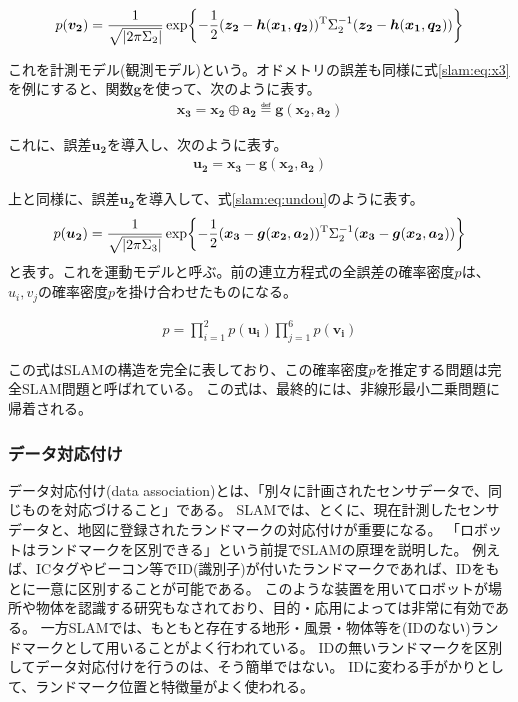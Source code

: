 \begin{align}
  p(\bm{v_2}) =\frac{1}{\sqrt{|2\pi\Sigma_2|}}\exp\biggl\{-\frac{1}{2}(\bm{z_2}-\bm{h}(\bm{x_1},\bm{q_2}))^{\rm{T}}\Sigma_2^{-1}(\bm{z_2}-\bm{h}(\bm{x_1},\bm{q_2}))\biggr\}\label{slam:eq:keisoku}
\end{align}

これを計測モデル(観測モデル)という。オドメトリの誤差も同様に式\eqref{slam:eq:x3}を例にすると、関数$\bm{g}$を使って、次のように表す。
\begin{align*}
  \bm{x_3} = \bm{x_2}\oplus \bm{a_2} \eqdef \bm{g}(\bm{x_2},\bm{a_2})
\end{align*}

これに、誤差$\bm{u_2}$を導入し、次のように表す。
\begin{align*}
  \bm{u_2} = \bm{x_3}-\bm{g}(\bm{x_2,a_2})
\end{align*}

上と同様に、誤差$\bm{u_2}$を導入して、式\eqref{slam:eq:undou}のように表す。
\begin{align}
  p(\bm{u_2}) = \frac{1}{\sqrt{|2\pi\Sigma_3|}}\exp\biggl\{-\frac{1}{2}(\bm{x_3}-\bm{g}(\bm{x_2},\bm{a_2}))^{\rm{T}}\Sigma_2^{-1}(\bm{x_3}-\bm{g}(\bm{x_2},\bm{a_2}))\biggr\} \label{slam:eq:undou}
\end{align}
と表す。これを運動モデルと呼ぶ。前の連立方程式の全誤差の確率密度$p$は、$u_i, v_j$の確率密度$p$を掛け合わせたものになる。

\begin{align}
  p = \prod_{i=1}^{2}p(\bm{u_i})\prod_{j=1}^{6}p(\bm{v_i})
\end{align}

この式はSLAMの構造を完全に表しており、この確率密度$p$を推定する問題は完全SLAM問題と呼ばれている。
この式は、最終的には、非線形最小二乗問題に帰着される。

\subsubsection{データ対応付け}
データ対応付け(data association)とは、「別々に計画されたセンサデータで、同じものを対応づけること」である。
SLAMでは、とくに、現在計測したセンサデータと、地図に登録されたランドマークの対応付けが重要になる。
「ロボットはランドマークを区別できる」という前提でSLAMの原理を説明した。
例えば、ICタグやビーコン等でID(識別子)が付いたランドマークであれば、IDをもとに一意に区別することが可能である。
このような装置を用いてロボットが場所や物体を認識する研究もなされており、目的・応用によっては非常に有効である。
一方SLAMでは、もともと存在する地形・風景・物体等を(IDのない)ランドマークとして用いることがよく行われている。
IDの無いランドマークを区別してデータ対応付けを行うのは、そう簡単ではない。
IDに変わる手がかりとして、ランドマーク位置と特徴量がよく使われる。


